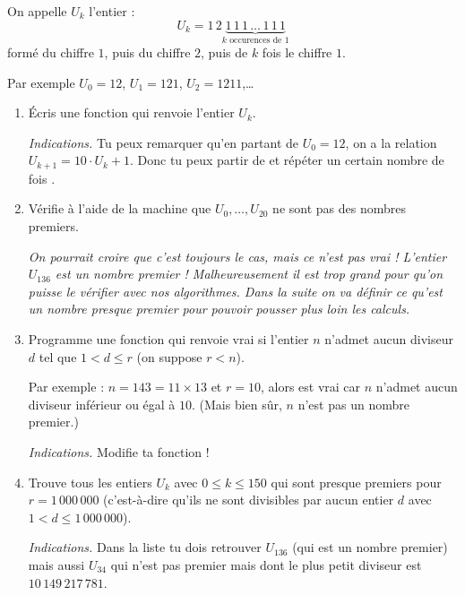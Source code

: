 \documentclass[11pt,class=report,crop=false]{standalone}
\begin{document}

\begin{activite}


On appelle $U_k$ l'entier :
$$U_k = 1\,2 \underbrace{1\,1\,1\,\ldots\,1\,1\,1}_{k \text{ occurences de } 1}$$
formé du chiffre $1$, puis du chiffre $2$, puis de $k$ fois le chiffre $1$.

Par exemple $U_0 = 12$, $U_1 = 121$, $U_2 = 1211$,\ldots




\begin{enumerate}
  \item \'Ecris une fonction  qui renvoie l'entier $U_k$.
  
  \emph{Indications.} Tu peux remarquer qu'en partant de $U_0=12$, on a la relation
  $U_{k+1} = 10 \cdot U_k + 1$. Donc tu peux partir de  et répéter un certain nombre de fois .
  
  \item Vérifie à l'aide de la machine que $U_0,\ldots,U_{20}$ ne sont pas des nombres premiers. 
  
  \medskip
  
 \emph{On pourrait croire que c'est toujours le cas, mais ce n'est pas vrai ! L'entier $U_{136}$ est un nombre premier ! Malheureusement il est trop grand pour qu'on puisse le vérifier avec nos algorithmes. Dans la suite on va définir ce qu'est un \emph{nombre presque premier} pour pouvoir pousser plus loin les calculs.}
  
  \item Programme une fonction  qui renvoie \og{}vrai\fg{} si l'entier $n$ n'admet aucun diviseur $d$ tel que $1< d \le r$ (on suppose $r<n$). 
  
  Par exemple : $n = 143 = 11 \times 13$ et $r=10$, alors  est
  \og{}vrai\fg{} car $n$ n'admet aucun diviseur inférieur ou égal à $10$. (Mais bien sûr, $n$ n'est pas un nombre premier.)
  
  \emph{Indications.} Modifie ta fonction  !
  
  \item Trouve tous les entiers $U_k$ avec $0\le k \le 150$ qui sont presque premiers pour 
  $r = 1 \,000\,000$ (c'est-à-dire qu'ils ne sont divisibles par aucun entier $d$ avec $1<d \le 1\,000\,000$).
  
  \emph{Indications.} Dans la liste tu dois retrouver $U_{136}$ (qui est un nombre premier) mais aussi $U_{34}$ qui n'est pas premier mais dont le plus petit diviseur est
  $10\,149\,217\,781$.
\end{enumerate}   
     
\end{activite}
\end{document}
